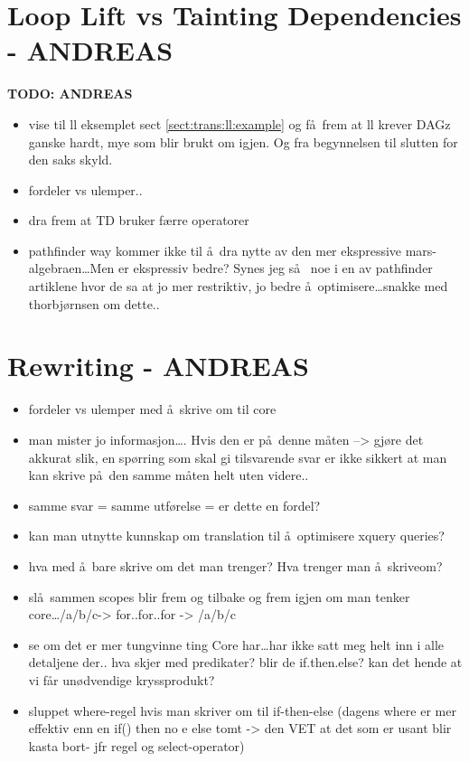 \section{Loop Lift vs Tainting Dependencies - {{ANDREAS}}}
\textbf{\LARGE TODO: {ANDREAS}}
\label{sect:disc:llvsTD}
\begin{itemize}
  \item vise til ll eksemplet sect \ref{sect:trans:ll:example} og f\aa~frem at ll krever DAGz ganske hardt,
  mye som blir brukt om igjen. Og fra begynnelsen til slutten for den saks skyld.
  \item fordeler vs ulemper..
  \item dra frem at TD bruker f\ae rre operatorer
  \item pathfinder way kommer ikke til \aa~dra nytte av den mer ekspressive mars-algebraen\ldots Men er ekspressiv
	  bedre? Synes jeg s\aa~ noe i en av pathfinder artiklene hvor de sa at jo mer restriktiv, jo bedre
	  \aa~optimisere\ldots snakke med thorbj\o rnsen om dette..
\end{itemize}

\section{Rewriting - {ANDREAS}}
\label{sect:disc:rewriting}
\begin{itemize}
  \item fordeler vs ulemper med \aa~skrive om til core
  \item man mister jo informasjon\ldots. Hvis den er p\aa~denne m\aa ten --> gj\o re det akkurat
	  slik, en sp\o rring som skal gi tilsvarende svar er ikke sikkert at man kan
	  skrive p\aa~den samme m\aa ten helt uten videre..  
  \item samme svar = samme utf\o relse = er dette en fordel?
  \item kan man utnytte kunnskap om translation til \aa~optimisere xquery queries?
  \item hva med \aa~bare skrive om det man trenger? Hva trenger man \aa~skriveom?
  \item sl\aa~sammen scopes blir frem og tilbake og frem igjen om man tenker core\ldots /a/b/c-> for..for..for ->
  /a/b/c
  \item se om det er mer tungvinne ting Core har\ldots har ikke satt meg helt inn i alle detaljene der.. hva skjer
  med predikater? blir de if.then.else? kan det hende at vi f\aa r un\o dvendige kryssprodukt?
  \item sluppet where-regel hvis man skriver om til if-then-else (dagens where er mer effektiv enn en if() then no
 e else tomt -> den VET at det som er usant blir kasta bort- jfr regel og select-operator)
\end{itemize}

